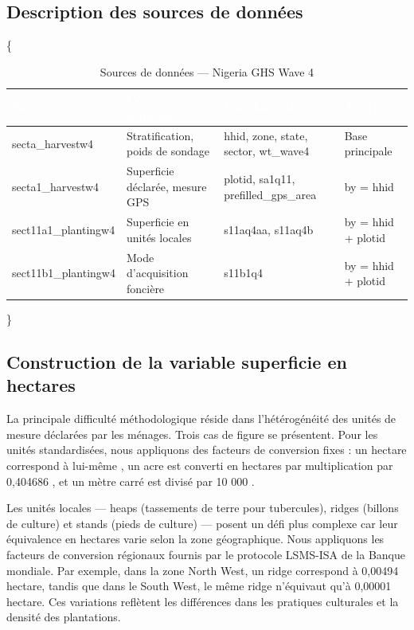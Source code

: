 \documentclass[
  french,
  10pt,
]{article}
\begin{document}
\subsection{Description des sources de
données}\label{description-des-sources-de-donnuxe9es}

\{ \footnotesize {}

\begin{table}

\caption{\label{tab:desc-sources-table}Sources de données --- Nigeria GHS Wave 4}
\centering
\begin{tabular}[t]{llll}
\toprule
\cellcolor{NavyBlue}\textcolor{white}{\textbf{Fichier}} & \cellcolor{NavyBlue}\textcolor{white}{\textbf{Contenu principal}} & \cellcolor{NavyBlue}\textcolor{white}{\textbf{Variables clés}} & \cellcolor{NavyBlue}\textcolor{white}{\textbf{Jointure}}\\
\midrule
secta\_harvestw4 & Stratification, poids de sondage & hhid, zone, state, sector, wt\_wave4 & Base principale\\
secta1\_harvestw4 & Superficie déclarée, mesure GPS & plotid, sa1q11, prefilled\_gps\_area & by = hhid\\
sect11a1\_plantingw4 & Superficie en unités locales & s11aq4aa, s11aq4b & by = hhid + plotid\\
sect11b1\_plantingw4 & Mode d'acquisition foncière & s11b1q4 & by = hhid + plotid\\
\bottomrule
\end{tabular}
\end{table}

\}

\subsection{Construction de la variable superficie en
hectares}\label{methodo-superficie}

La principale difficulté méthodologique réside dans l'hétérogénéité des
unités de mesure déclarées par les ménages. Trois cas de figure se
présentent. Pour les unités standardisées, nous appliquons des facteurs
de conversion fixes : un hectare correspond à lui-même , un acre est
converti en hectares par multiplication par 0,404686 , et un mètre carré
est divisé par 10 000 .

Les unités locales --- heaps (tassements de terre pour tubercules),
ridges (billons de culture) et stands (pieds de culture) --- posent un
défi plus complexe car leur équivalence en hectares varie selon la zone
géographique. Nous appliquons les facteurs de conversion régionaux
fournis par le protocole LSMS-ISA de la Banque mondiale. Par exemple,
dans la zone North West, un ridge correspond à 0,00494 hectare, tandis
que dans le South West, le même ridge n'équivaut qu'à 0,00001 hectare.
Ces variations reflètent les différences dans les pratiques culturales
et la densité des plantations.
\end{document}
